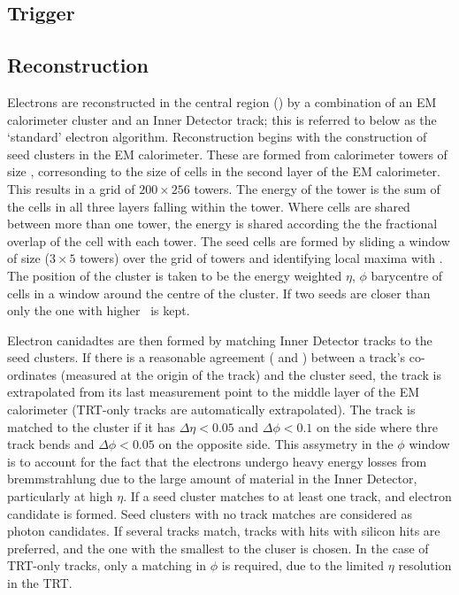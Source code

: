 \subsection{Trigger}
\label{sec:reco-el-triggers}

\subsection{Reconstruction}
Electrons are reconstructed in the central region () by a
combination of an EM calorimeter cluster and an Inner Detector track; this is
referred to below as the `standard' electron algorithm. Reconstruction begins
with the construction of seed clusters in the EM calorimeter. These are formed from
calorimeter towers of size , corresonding to the
size of cells in the second layer of the EM calorimeter. This
results in a grid of $200 \times 256$ towers. The energy
of the tower is the sum of the cells in all three layers
falling within the tower. Where cells are shared between more than one tower, the
energy is shared according the the fractional overlap of the cell with each
tower. The seed cells are formed by sliding a
window of size  ($3 \times 5$ towers) over the
grid of towers and identifying local maxima with . The position
of the cluster is taken to be the energy weighted $\eta$, $\phi$ barycentre of
cells in a window around the centre of the cluster. If two seeds are closer than
 only the one with higher \et\ is kept.

Electron canidadtes are then formed by matching Inner Detector tracks to the
seed clusters. If there is a reasonable agreement ( and
) between a track's co-ordinates (measured at the origin of the
track) and
the cluster seed, the track is extrapolated from its last measurement point to
the middle layer of the EM calorimeter (TRT-only tracks are automatically
extrapolated). The track is matched to the cluster if it has $\Delta \eta <
0.05$ and $\Delta \phi < 0.1$ on the side where thre track bends and  $\Delta
\phi < 0.05$ on the opposite side. This assymetry in the $\phi$ window is to
account for the fact that the electrons undergo heavy energy losses from
bremmstrahlung due to the large amount of material in the Inner Detector,
particularly at high $\eta$. If a seed cluster matches to at least one track,
and electron candidate is formed. Seed clusters with no track matches are
considered as photon candidates. If several tracks match, tracks with hits with
silicon hits are preferred, and the one with the smallest \deltaR to the cluser
is chosen. In the case of TRT-only tracks, only a matching in $\phi$ is required, 
due to the limited $\eta$ resolution in the TRT.

